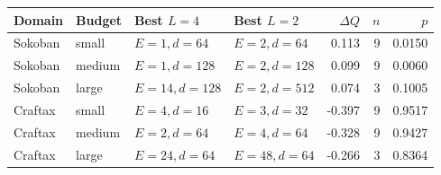 \documentclass[10pt]{article}
\begin{document}
\setcounter{table}{2}
\begin{center}
\small
\setlength{\tabcolsep}{4.0pt}
\begin{tabular}{@{}llllrrr@{}}
  \toprule
  Domain & Budget & Best \(L=4\) & Best \(L=2\) & \(\Delta Q\) & \(n\) & \(p\) \\
  \midrule
  Sokoban & small & \(E=1,d=64\) & \(E=2,d=64\) & 0.113 & 9 & 0.0150 \\
  Sokoban & medium & \(E=1,d=128\) & \(E=2,d=128\) & 0.099 & 9 & 0.0060 \\
  Sokoban & large & \(E=14,d=128\) & \(E=2,d=512\) & 0.074 & 3 & 0.1005 \\
  Craftax & small & \(E=4,d=16\) & \(E=3,d=32\) & -0.397 & 9 & 0.9517 \\
  Craftax & medium & \(E=2,d=64\) & \(E=4,d=64\) & -0.328 & 9 & 0.9427 \\
  Craftax & large & \(E=24,d=64\) & \(E=48,d=64\) & -0.266 & 3 & 0.8364 \\
  \bottomrule
\end{tabular}
\end{center}
\vspace{0.5em}
\end{document}
